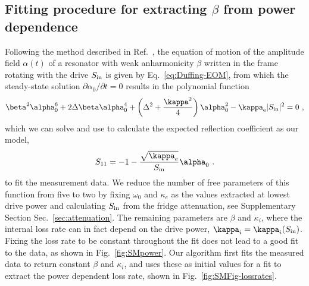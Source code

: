 \subsection{Fitting procedure for extracting $\beta$ from power dependence}\label{sec:SMduffing}

Following the method described in Ref.~\cite{schmidtCurrentDetectionUsing2020}, the equation of motion of the amplitude field $\alpha(t)$ of a resonator with weak anharmonicity $\beta$ written in the frame rotating with the drive $S_{\rm in}$ is given by Eq.~\ref{eq:Duffing-EOM}, from which the steady-state solution $\partial\alpha_0/\partial t=0$ results in the polynomial function
% 
\begin{align}
\beta^2 \alpha_0^6 + 2\Delta\beta\alpha_0^4 + \left(\Delta^2+\frac{\kappa^2}{4}\right)\alpha_0^2 - \kappa_\text{e} \abs{S_{\rm in}}^2 = 0\ ,
\label{eq:polynom}
\end{align}
%
which we can solve and use to calculate the expected reflection coefficient as our model,
\begin{align}
S_{11}=-1-\frac{\sqrt{\kappa_e}}{S_{\rm in}}\alpha_0\ .
\label{eq:S11anh}
\end{align}
%
to fit the measurement data.
%
We reduce the number of free parameters of this function from five to two by fixing $\omega_0$ and $\kappa_e$ as the values extracted at lowest drive power and calculating $S_{\rm in}$ from the fridge attenuation, see Supplementary Section Sec.~\ref{sec:attenuation}.
%
The remaining parameters are $\beta$ and $\kappa_i$, where the internal loss rate can in fact depend on the drive power, $\kappa_i=\kappa_i(S_{\rm in})$.
%
Fixing the loss rate to be constant throughout the fit does not lead to a good fit to the data, as shown in Fig.~\ref{fig:SMpower}.
%
Our algorithm first fits the measured data to return constant $\beta$ and $\kappa_i$, and uses these as initial values for a fit to extract the power dependent loss rate, shown in Fig.~\ref{fig:SMFig-lossrates}.

